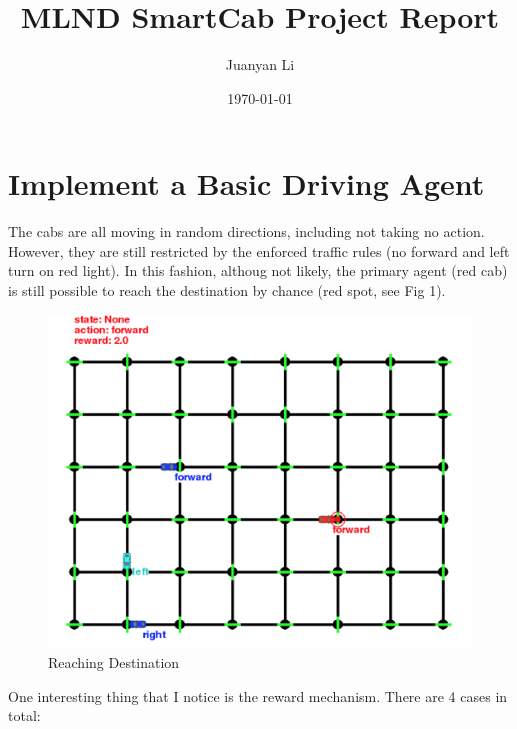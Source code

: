 \documentclass[12pt,a4paper]{article}
\begin{document}
\title{MLND SmartCab Project Report}
\author{Juanyan Li}
\date{\today}
\maketitle

\section{Implement a Basic Driving Agent
}
The cabs are all moving in random directions, including not taking no action. However, they are still restricted by the enforced traffic rules (no forward and left turn on red light). In this fashion, althoug not likely, the primary agent (red cab) is still possible to reach the destination by chance (red spot, see Fig 1). 

\begin{figure}[H]
\caption{Reaching Destination}
\includegraphics[width=12cm]{fig1.png}
\centering
\end{figure}

One interesting thing that I notice is the reward mechanism. There are 4 cases in total:
\end{document}
